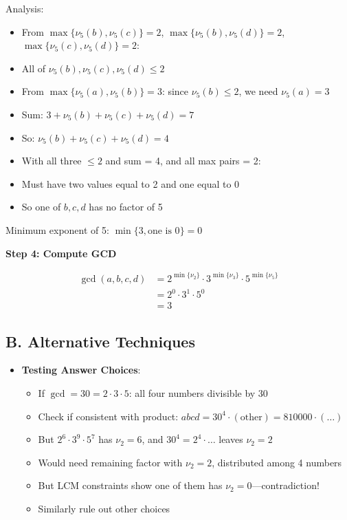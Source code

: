 \documentclass[12pt]{article}
\begin{document}
\begin{techniquesbox}
\begin{itemize}[leftmargin=*]
    Analysis:
    \begin{itemize}
        \item From $\max\{\nu_5(b), \nu_5(c)\} = 2$, $\max\{\nu_5(b), \nu_5(d)\} = 2$, $\max\{\nu_5(c), \nu_5(d)\} = 2$:
        \item All of $\nu_5(b), \nu_5(c), \nu_5(d) \leq 2$
        \item From $\max\{\nu_5(a), \nu_5(b)\} = 3$: since $\nu_5(b) \leq 2$, we need $\nu_5(a) = 3$
        \item Sum: $3 + \nu_5(b) + \nu_5(c) + \nu_5(d) = 7$
        \item So: $\nu_5(b) + \nu_5(c) + \nu_5(d) = 4$
        \item With all three $\leq 2$ and sum = 4, and all max pairs = 2:
        \item Must have two values equal to 2 and one equal to 0
        \item So one of $b, c, d$ has no factor of 5
    \end{itemize}
    
    Minimum exponent of 5: $\min\{3, \text{one is 0}\} = 0$
    
    \textbf{Step 4: Compute GCD}
    
    \begin{align*}
    \gcd(a,b,c,d) &= 2^{\min\{\nu_2\}} \cdot 3^{\min\{\nu_3\}} \cdot 5^{\min\{\nu_5\}}\\
    &= 2^0 \cdot 3^1 \cdot 5^0\\
    &= 3
    \end{align*}
\end{itemize}

\subsection*{B. Alternative Techniques}
\begin{itemize}[leftmargin=*]
    \item \textbf{Testing Answer Choices}:
    \begin{itemize}
        \item If $\gcd = 30 = 2 \cdot 3 \cdot 5$: all four numbers divisible by 30
        \item Check if consistent with product: $abcd = 30^4 \cdot (\text{other}) = 810000 \cdot (\ldots)$
        \item But $2^6 \cdot 3^9 \cdot 5^7$ has $\nu_2 = 6$, and $30^4 = 2^4 \cdot \ldots$ leaves $\nu_2 = 2$
        \item Would need remaining factor with $\nu_2 = 2$, distributed among 4 numbers
        \item But LCM constraints show one of them has $\nu_2 = 0$—contradiction!
        \item Similarly rule out other choices
    \end{itemize}
\end{itemize}


\end{techniquesbox}
\end{document}
